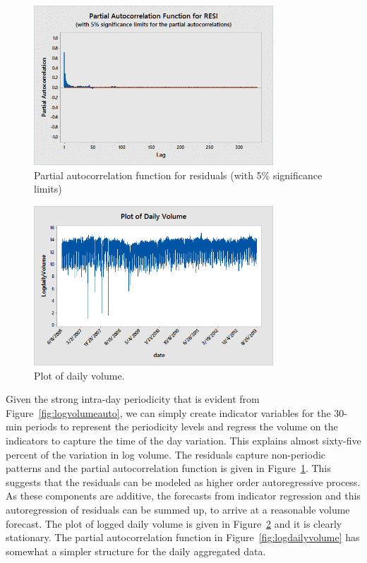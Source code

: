         \begin{figure}[!ht]
        \centering
        \includegraphics[width=0.8\textwidth]{chapters/chapter_stat_ts/figures/resi.png}
        \caption{Partial autocorrelation function for residuals (with 5\% significance limits) \label{fig:partresi}}
        \end{figure}
        
        \begin{figure}[!ht]
        \centering
        \includegraphics[width=0.8\textwidth]{chapters/chapter_stat_ts/figures/dailyvol.png}
        \caption{Plot of daily volume. \label{fig:dailyvol}}
        \end{figure}


Given the strong intra-day periodicity that is evident from Figure~\ref{fig:logvolumeauto}, we can simply create indicator variables for the 30-min periods to represent the periodicity levels and regress the volume on the indicators to capture the time of the day variation. This explains almost sixty-five percent of the variation in log volume. The residuals capture non-periodic patterns and the partial autocorrelation function is given in Figure~\ref{fig:partresi}. This suggests that the residuals can be modeled as higher order autoregressive process. As these components are additive, the forecasts from indicator regression and this autoregression of residuals can be summed up, to arrive at a reasonable volume forecast. The plot of logged daily volume is given in Figure~\ref{fig:dailyvol} and it is clearly stationary. The partial autocorrelation function in Figure~\ref{fig:logdailyvolume} has somewhat a simpler structure for the daily aggregated data. 


